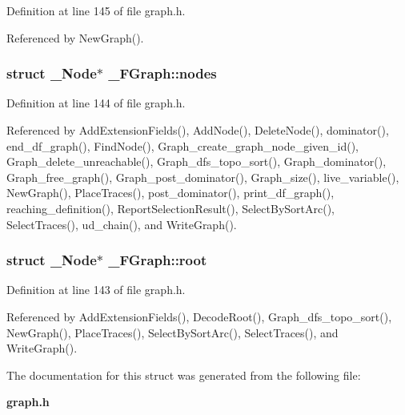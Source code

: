 Definition at line 145 of file graph.h.

Referenced by New\-Graph().
\subsubsection{\setlength{\rightskip}{0pt plus 5cm}struct \bf{\_\-Node}$\ast$ \bf{\_\-FGraph::nodes}}\label{struct__FGraph_3e82be17809cacde8568d22c925f17b4}




Definition at line 144 of file graph.h.

Referenced by Add\-Extension\-Fields(), Add\-Node(), Delete\-Node(), dominator(), end\_\-df\_\-graph(), Find\-Node(), Graph\_\-create\_\-graph\_\-node\_\-given\_\-id(), Graph\_\-delete\_\-unreachable(), Graph\_\-dfs\_\-topo\_\-sort(), Graph\_\-dominator(), Graph\_\-free\_\-graph(), Graph\_\-post\_\-dominator(), Graph\_\-size(), live\_\-variable(), New\-Graph(), Place\-Traces(), post\_\-dominator(), print\_\-df\_\-graph(), reaching\_\-definition(), Report\-Selection\-Result(), Select\-By\-Sort\-Arc(), Select\-Traces(), ud\_\-chain(), and Write\-Graph().
\subsubsection{\setlength{\rightskip}{0pt plus 5cm}struct \bf{\_\-Node}$\ast$ \bf{\_\-FGraph::root}}\label{struct__FGraph_f73cfa6c3434757f83ff887cf766c93c}




Definition at line 143 of file graph.h.

Referenced by Add\-Extension\-Fields(), Decode\-Root(), Graph\_\-dfs\_\-topo\_\-sort(), New\-Graph(), Place\-Traces(), Select\-By\-Sort\-Arc(), Select\-Traces(), and Write\-Graph().

The documentation for this struct was generated from the following file:\begin{CompactItemize}
\item 
\bf{graph.h}\end{CompactItemize}
